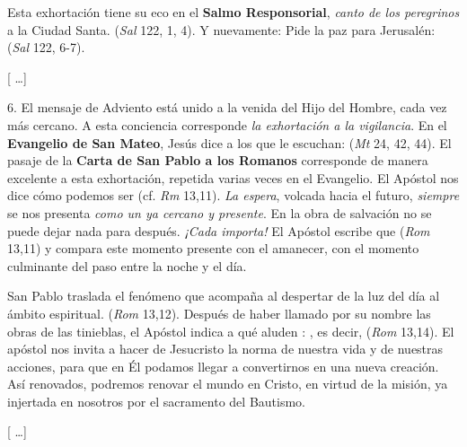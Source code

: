 \begin{body}
					Esta exhortación tiene su eco en el \textbf{Salmo Responsorial}, \emph{canto de los peregrinos} a la Ciudad Santa.  (\emph{Sal} 122, 1, 4). Y nuevamente: Pide la paz para Jerusalén:  (\emph{Sal} 122, 6-7). 
					
					{[} \ldots{}{]} 
					
					6. El mensaje de Adviento está unido a la venida del Hijo del Hombre, cada vez más cercano. A esta conciencia corresponde \emph{la exhortación a la vigilancia}. En el \textbf{Evangelio de San Mateo}, Jesús dice a los que le escuchan:  (\emph{Mt} 24, 42, 44). El pasaje de la \textbf{Carta de San Pablo a los Romanos} corresponde de manera excelente a esta exhortación, repetida varias veces en el Evangelio. El Apóstol nos dice cómo podemos ser  (cf. \emph{Rm} 13,11). \emph{La espera}, volcada hacia el futuro, \emph{siempre} se nos presenta \emph{como un  ya cercano y presente}. En la obra de salvación no se puede dejar nada para después. \emph{¡Cada  importa!} El Apóstol escribe que  (\emph{Rom} 13,11) y compara este momento presente con el amanecer, con el momento culminante del paso entre la noche y el día. 
					
					San Pablo traslada el fenómeno que acompaña al despertar de la luz del día al ámbito espiritual.  (\emph{Rom} 13,12). Después de haber llamado por su nombre las obras de las tinieblas, el Apóstol indica a qué aluden : , es decir,  (\emph{Rom} 13,14). El apóstol nos invita a hacer de Jesucristo la norma de nuestra vida y de nuestras acciones, para que en Él podamos llegar a convertirnos en una nueva creación. Así renovados, podremos renovar el mundo en Cristo, en virtud de la misión, ya injertada en nosotros por el sacramento del Bautismo. 
					
					{[} \ldots{}{]}
				\end{body}
		
